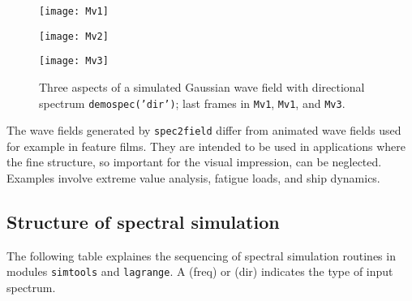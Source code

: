 \begin{figure}
\centerline{
\texttt{[image: Mv1]}
}
\vspace{3mm}
\centerline{
\texttt{[image: Mv2]}
}\vspace{3mm}
\centerline{
\texttt{[image: Mv3]}
}
\vspace{-1mm}
\caption[Three aspects of Gaussian wave field]%
{Three aspects of a simulated Gaussian wave field with directional spectrum {\tt demospec('dir')}; last frames in 
{\tt Mv1}, {\tt Mv1}, and {\tt Mv3}.}
\label{Fig:threefields}
\end{figure}

\begin{remark}
The wave fields generated by {\tt spec2field} differ from animated wave fields used for example 
in feature films. They are intended to be used in applications where the fine structure, 
so important for the visual impression,  can be neglected. Examples involve extreme value analysis, 
fatigue loads, and ship dynamics.
\end{remark}

\subsection{Structure of spectral simulation}
The following table explaines the sequencing of spectral simulation routines in modules {\tt simtools} and {\tt lagrange}. 
A (freq) or (dir) indicates the type of input spectrum.   
\vspace{5mm}

